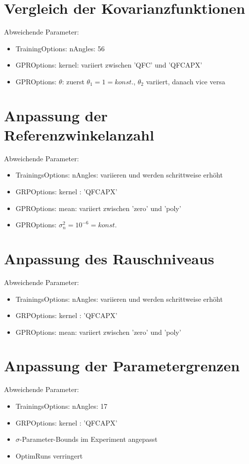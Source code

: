 \section{Vergleich der Kovarianzfunktionen}\label{sec:paramexp1}


Abweichende Parameter:

\begin{itemize}
	\item TrainingOptions: nAngles: 56
	\item GPROptions: kernel: variiert zwischen 'QFC' und 'QFCAPX'
	\item GPROptions: $\theta$: zuerst $\theta_1 = 1 = konst.$, $\theta_2$ variiert, danach vice versa 
\end{itemize}


\section{Anpassung der Referenzwinkelanzahl}\label{sec:paramexp2}


Abweichende Parameter:

\begin{itemize}
	\item TrainingsOptions: nAngles: variieren und werden schrittweise erhöht
	\item GRPOptions: kernel : 'QFCAPX'
	\item GPROptions: mean: variiert zwischen 'zero' und 'poly'
	\item GPROptions: $\sigma_n^2 = 10^{-6} = konst.$
\end{itemize}


\section{Anpassung des Rauschniveaus}\label{sec:paramexp3}


Abweichende Parameter:

\begin{itemize}
	\item TrainingsOptions: nAngles: variieren und werden schrittweise erhöht
	\item GRPOptions: kernel : 'QFCAPX'
	\item GPROptions: mean: variiert zwischen 'zero' und 'poly'
\end{itemize}


\section{Anpassung der Parametergrenzen}\label{sec:paramexp4}


Abweichende Parameter:

\begin{itemize}
	\item TrainingsOptions: nAngles: 17
	\item GRPOptions: kernel : 'QFCAPX'
	\item $\sigma$-Parameter-Bounds im Experiment angepasst
	\item OptimRuns verringert
\end{itemize}
